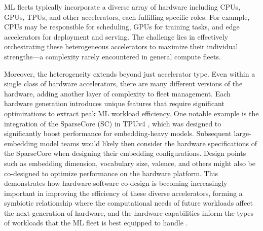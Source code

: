 ML fleets typically incorporate a diverse array of hardware including CPUs, GPUs, TPUs, and other accelerators, each fulfilling specific roles. For example, CPUs may be responsible for scheduling, GPUs for training tasks, and edge accelerators \cite{yazdanbakhsh2021edge} for deployment and serving. The challenge lies in effectively orchestrating these heterogeneous accelerators to maximize their individual strengths---a complexity rarely encountered in general compute fleets.

Moreover, the heterogeneity extends beyond just accelerator type. Even within a single class of hardware accelerators, there are many different versions of the hardware, adding another layer of complexity to fleet management. Each hardware generation introduces unique features that require significant optimizations to extract peak ML workload efficiency. One notable example is the integration of the SparseCore (SC) in TPUv4 \cite{jouppi2023tpuv4opticallyreconfigurable}, which was designed to significantly boost performance for embedding-heavy models. Subsequent large-embedding model teams would likely then consider the hardware specifications of the SparseCore when designing their embedding configurations. Design points such as embedding dimension, vocabulary size, valence, and others might also be co-designed to optimize performance on the hardware platform. This demonstrates how hardware-software co-design is becoming increasingly important in improving the efficiency of these diverse accelerators, forming a symbiotic relationship where the computational needs of future workloads affect the next generation of hardware, and the hardware capabilities inform the types of workloads that the ML fleet is best equipped to handle \cite{shi2020learned}.







